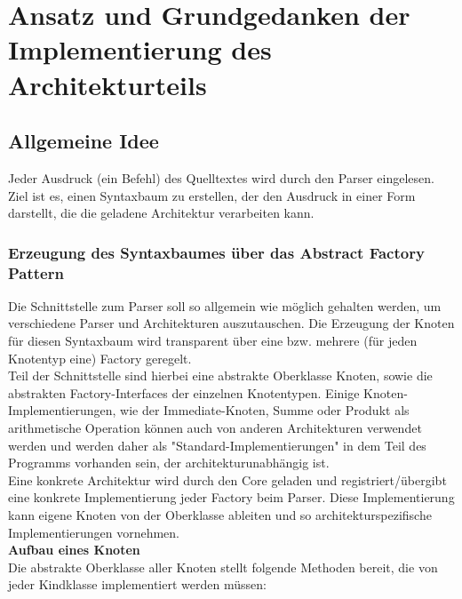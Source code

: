 
\section{Ansatz und Grundgedanken der Implementierung des Architekturteils}
\subsection{Allgemeine Idee}
Jeder Ausdruck (ein Befehl) des Quelltextes wird durch den Parser eingelesen. Ziel ist es, einen Syntaxbaum zu erstellen, der den Ausdruck in einer Form darstellt, die die geladene Architektur verarbeiten kann.

\subsubsection{Erzeugung des Syntaxbaumes über das Abstract Factory Pattern}
Die Schnittstelle zum Parser soll so allgemein wie möglich gehalten werden, um verschiedene Parser und Architekturen auszutauschen. Die Erzeugung der Knoten für diesen Syntaxbaum wird transparent über eine bzw. mehrere (für jeden Knotentyp eine) Factory geregelt.\\
Teil der Schnittstelle sind hierbei eine abstrakte Oberklasse Knoten, sowie die abstrakten Factory-Interfaces der einzelnen Knotentypen. Einige Knoten-Implementierungen, wie der Immediate-Knoten, Summe oder Produkt als arithmetische Operation können auch von anderen Architekturen verwendet werden und werden daher als "Standard-Implementierungen" in dem Teil des Programms vorhanden sein, der architekturunabhängig ist.\\
Eine konkrete Architektur wird durch den Core geladen und registriert/übergibt eine konkrete Implementierung jeder Factory beim Parser. Diese Implementierung kann eigene Knoten von der Oberklasse ableiten und so architekturspezifische Implementierungen vornehmen.\\
\textbf{Aufbau eines Knoten}\\
Die abstrakte Oberklasse aller Knoten stellt folgende Methoden bereit, die von jeder Kindklasse implementiert werden müssen:
